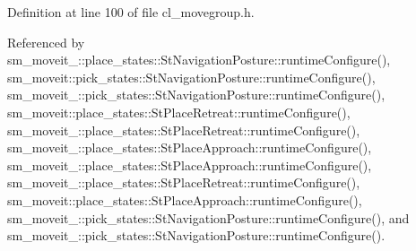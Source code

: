 Definition at line 100 of file cl\+\_\+movegroup.\+h.



Referenced by sm\+\_\+moveit\+\_\+::place\+\_\+states\+::\+St\+Navigation\+Posture\+::runtime\+Configure(), sm\+\_\+moveit\+::pick\+\_\+states\+::\+St\+Navigation\+Posture\+::runtime\+Configure(), sm\+\_\+moveit\+\_\+::pick\+\_\+states\+::\+St\+Navigation\+Posture\+::runtime\+Configure(), sm\+\_\+moveit\+::place\+\_\+states\+::\+St\+Place\+Retreat\+::runtime\+Configure(), sm\+\_\+moveit\+\_\+::place\+\_\+states\+::\+St\+Place\+Retreat\+::runtime\+Configure(), sm\+\_\+moveit\+\_\+::place\+\_\+states\+::\+St\+Place\+Approach\+::runtime\+Configure(), sm\+\_\+moveit\+\_\+::place\+\_\+states\+::\+St\+Place\+Approach\+::runtime\+Configure(), sm\+\_\+moveit\+\_\+::place\+\_\+states\+::\+St\+Place\+Retreat\+::runtime\+Configure(), sm\+\_\+moveit\+::place\+\_\+states\+::\+St\+Place\+Approach\+::runtime\+Configure(), sm\+\_\+moveit\+\_\+::pick\+\_\+states\+::\+St\+Navigation\+Posture\+::runtime\+Configure(), and sm\+\_\+moveit\+\_\+::pick\+\_\+states\+::\+St\+Navigation\+Posture\+::runtime\+Configure().


